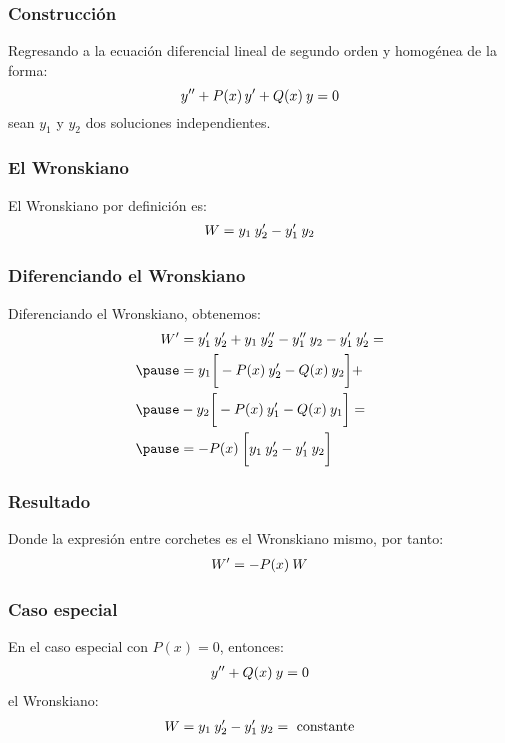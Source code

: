 \documentclass[12pt]{beamer}
\begin{document}
\begin{frame}
\frametitle{Construcción}
Regresando a la ecuación diferencial lineal de segundo orden y homogénea de la forma:
\pause
\begin{equation}
{y}^{\prime \prime} + P (x) \, {y}^{\prime} + Q (x) \: y = 0
\label{eq:ecuacion_09_118}
\end{equation}
sean $y_{1}$ y $y_{2}$ dos soluciones independientes.
\end{frame}
\begin{frame}
\frametitle{El Wronskiano}
El Wronskiano por definición es:
\pause
\begin{align}
W = y_{1} \: {y}^{\prime}_{2} - {y}^{\prime}_{1} \: y_{2}
\label{eq:ecuacion_09_119}
\end{align}
\end{frame}
\begin{frame}
\frametitle{Diferenciando el Wronskiano}
Diferenciando el Wronskiano, obtenemos:
\pause
\begin{eqnarray*}
\begin{aligned}
\pderivada{W} &= \pderivada{y}_{1} \: \pderivada{y}_{2} + y_{1} \: \sderivada{y}_{2} - \sderivada{y}_{1} \: y_{2} - \pderivada{y}_{1} \: \pderivada{y}_{2} = \\ \pause
&= y_{1} \bigg[ - P(x) \: \pderivada{y}_{2} - Q(x) \: y_{2} \bigg] + \\ \pause
&- y_{2} \bigg[ - P(x) \: \pderivada{y}_{1} - Q(x)  \: y_{1} \bigg] = \\ \pause
&= - P(x) \: \bigg[ y_{1} \: \pderivada{y}_{2} - \pderivada{y}_{1} \: y_{2} \bigg]
\end{aligned}
\end{eqnarray*}
\end{frame}
\begin{frame}
\frametitle{Resultado}
Donde la expresión entre corchetes es el Wronskiano mismo, por tanto:
\pause
\begin{align}
{W}^{\prime} = - P(x) \: W
\label{eq:ecuacion_09_120}
\end{align}
\end{frame}
\begin{frame}
\frametitle{Caso especial}
En el caso especial con $P(x) = 0$, entonces:
\pause
\begin{align}
{y}^{\prime \prime} + Q(x) \: y = 0
\label{eq:ecuacion_09_121}
\end{align}
el Wronskiano:
\pause
\begin{align}
W = y_{1} \: {y}^{\prime}_{2} - {y}^{\prime}_{1} \: y_{2} = \mbox{ constante}
\label{eq:ecuacion_09_1202}
\end{align}
\end{frame}
\end{document}
